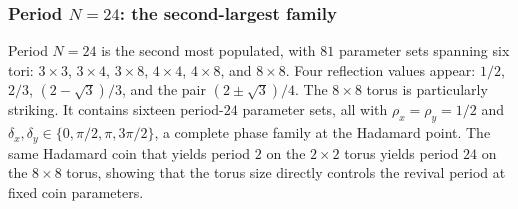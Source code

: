 \subsubsection{Period $N = 24$: the second-largest family}

Period $N = 24$ is the second most populated, with $81$ parameter sets
spanning six tori: $3 \times 3$, $3 \times 4$, $3 \times 8$,
$4 \times 4$, $4 \times 8$, and $8 \times 8$. Four reflection values
appear: $1/2$, $2/3$, $(2-\sqrt{3})/3$, and the pair
$(2 \pm \sqrt{3})/4$. The $8 \times 8$ torus is particularly striking.
It contains sixteen period-$24$ parameter sets, all with
$\rho_x = \rho_y = 1/2$ and
$\delta_x, \delta_y \in \{0, \pi/2, \pi, 3\pi/2\}$, a complete phase
family at the Hadamard point. The same Hadamard coin that yields
period $2$ on the $2 \times 2$ torus yields period $24$ on the
$8 \times 8$ torus, showing that the torus size directly controls the
revival period at fixed coin parameters.

